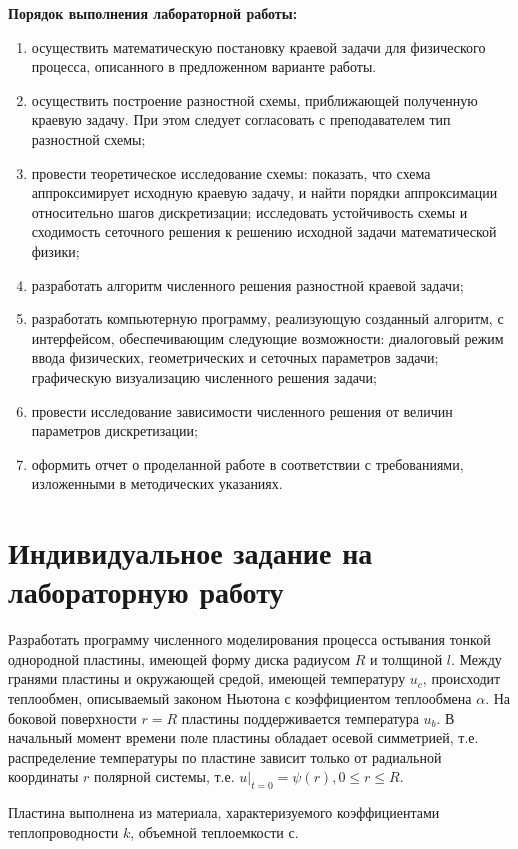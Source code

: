 \documentclass[a4paper,12pt,russian, fleqn]{extreport}
\begin{document}
	\textbf{Порядок выполнения лабораторной работы:}
	\begin{enumerate}
		\item осуществить математическую постановку краевой задачи для физического процесса, описанного в предложенном варианте работы.
		\item осуществить построение разностной схемы, приближающей полученную краевую задачу. При этом следует согласовать с преподавателем тип разностной схемы;
		\item провести теоретическое исследование схемы: показать, что схема аппроксимирует исходную краевую задачу, и найти порядки аппроксимации относительно шагов дискретизации; исследовать устойчивость схемы и сходимость сеточного решения к решению исходной задачи математической физики;
		\item разработать алгоритм численного решения разностной краевой задачи;
		\item разработать компьютерную программу, реализующую созданный алгоритм, с интерфейсом, обеспечивающим следующие возможности: диалоговый режим ввода физических, геометрических и сеточных параметров задачи; графическую визуализацию численного решения задачи;
		\item провести исследование зависимости численного решения от величин параметров дискретизации;
		\item оформить отчет о проделанной работе в соответствии с требованиями, изложенными в методических указаниях.
	\end{enumerate}
	
	\section{Индивидуальное задание на лабораторную работу}	
	Разработать программу численного моделирования процесса остывания тонкой однородной пластины, имеющей форму диска радиусом $R$ и толщиной $l$. Между гранями пластины и окружающей средой, имеющей температуру $u_c$, происходит теплообмен, описываемый законом Ньютона с коэффициентом теплообмена $\alpha$.  На боковой поверхности $r=R$ пластины поддерживается температура $u_b$. В начальный момент времени поле пластины обладает осевой симметрией, т.е. распределение температуры по пластине зависит только от радиальной координаты $r$ полярной системы, т.е. $u\lvert_{t=0} = \psi(r), 0 \leq r \leq R$.
	
	Пластина выполнена из материала, характеризуемого коэффициентами теплопроводности $k$, объемной теплоемкости $с$.
	
\end{document}
